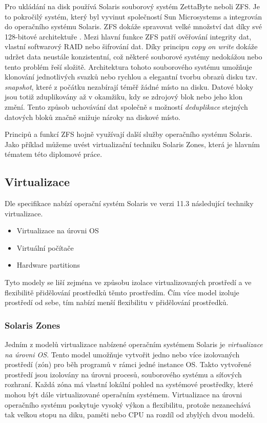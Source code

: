 Pro ukládání na disk používá Solaris souborový systém ZettaByte neboli ZFS. Je to pokročilý systém, který byl vyvinut společností Sun Microsystems a integrován do operačního systému Solaris. ZFS dokáže spravovat velké množství dat díky své 128-bitové 
architektuře \cite{cvut:thesis:mythesis}. Mezi hlavní funkce ZFS patří ověřování integrity dat, vlastní softwarový RAID nebo šifrování dat. Díky principu \textit{copy on write} dokáže udržet data neustále konzistentní, což některé souborové systémy nedokážou nebo tento problém řeší složitě.
Architektura tohoto souborového systému umožňuje klonování jednotlivých svazků nebo rychlou a elegantní tvorbu obrazů disku tzv. \textit{snapshot}, které z počátku nezabírají téměř žádné místo na disku. Datové bloky jsou totiž zduplikovány až v okamžiku,
kdy se zdrojový blok nebo jeho klon změní. Tento způsob uchovávání dat společně s možností \textit{deduplikace} stejných datových bloků značně snižuje nároky na diskové místo.

Principů a funkcí ZFS hojně využívají další služby operačního systému Solaris. Jako příklad můžeme uvést virtualizační techniku Solaris Zones, která je hlavním tématem této diplomové práce.

\subsection{Virtualizace}

Dle specifikace \cite{oracle:solaris:virtualization} nabízí operační systém Solaris ve verzi 11.3 následující techniky virtualizace.

\begin{itemize}
 \item Virtualizace na úrovni OS
 \item Virtuální počítače
 \item Hardware partitions
\end{itemize}

Tyto modely se liší zejména ve způsobu izolace virtualizovaných prostředí a ve flexibilitě přidělování prostředků
těmto prostředím. Čím více model izoluje prostředí od sebe, tím nabízí menší flexibilitu v přidělování prostředků.

\subsubsection{Solaris Zones}

Jedním z modelů virtualizace nabízené operačním systémem Solaris je \textit{virtualizace na úrovni OS}. Tento model umožňuje vytvořit jedno nebo více izolovaných prostředí (zón) pro běh programů v rámci jedné instance OS. Takto vytvořené prostředí jsou
izolovány na úrovni procesů, souborového systému a síťových rozhraní. Každá zóna má vlastní lokální pohled na systémové prostředky, které mohou být dále virtualizované operačním systémem. Virtualizace na úrovni operačního systému poskytuje vysoký výkon a flexibilitu,
protože nezanechává tak velkou stopu na diku, paměti nebo CPU na rozdíl od zbylých dvou modelů. 

